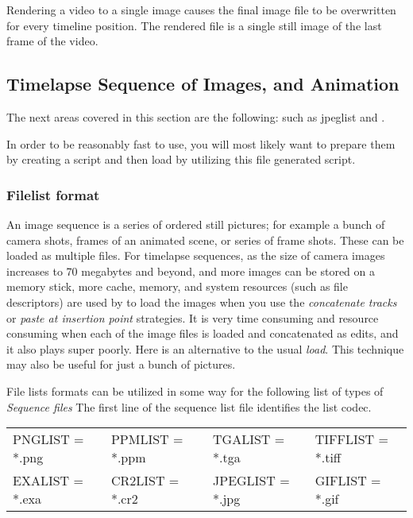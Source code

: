 Rendering a video to a single image causes the final image file to be overwritten for every timeline position. The rendered file is a single still image of the last frame of the video.

\subsection{Timelapse Sequence of Images, and Animation}%
\label{sub:timelaps_sequence_images_animation}

The next areas covered in this section are the following: 
 such as jpeglist and .

In order to be reasonably fast to use, you will most likely want to prepare them by creating a script and then load by utilizing this file generated script.

\subsubsection{Filelist format}%
\label{ssub:filelist_format}

An image sequence is a series of ordered still pictures; for example a bunch of camera shots, frames of an animated scene, or series of frame shots. These can be loaded as multiple files. For timelapse sequences, as the size of camera images increases to 70 megabytes and beyond, and more images can be stored on a memory stick, more cache, memory, and system resources (such as file descriptors) are used by \CGG{} to load the images when you use the \textit{concatenate tracks} or \textit{paste at insertion point} strategies.  It is very time consuming and resource consuming when each of the image files is loaded and concatenated as edits, and it also plays super poorly.  Here is an alternative to the usual \textit{load}.  This technique may also be useful for just a bunch of pictures.

File lists formats can be utilized in some way for the following list of types of \textit{Sequence files}  The first line of the sequence list file identifies the list codec.



\begin{center}
    \begin{tabular}{l l l l}
    PNGLIST = *.png	&	PPMLIST = *.ppm	&	TGALIST = *.tga	  &  TIFFLIST = *.tiff \\
    EXALIST = *.exa	&	CR2LIST = *.cr2	&	JPEGLIST = *.jpg	&    GIFLIST = *.gif
    \end{tabular}
\end{center}

